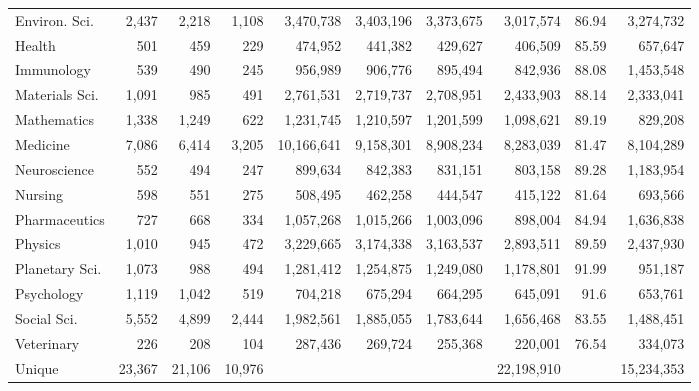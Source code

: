 \begin{tabular}{lrrrrrrrrr}
Environ. Sci.     &    2,437 &              2,218 &   1,108 &  3,470,738 &     3,403,196 & 3,373,675 &  3,017,574 &        86.94 &  3,274,732 \\
Health            &      501 &                459 &     229 &    474,952 &       441,382 &   429,627 &    406,509 &        85.59 &    657,647 \\
Immunology        &      539 &                490 &     245 &    956,989 &       906,776 &   895,494 &    842,936 &        88.08 &  1,453,548 \\
Materials Sci.    &    1,091 &                985 &     491 &  2,761,531 &     2,719,737 & 2,708,951 &  2,433,903 &        88.14 &  2,333,041 \\
Mathematics       &    1,338 &              1,249 &     622 &  1,231,745 &     1,210,597 & 1,201,599 &  1,098,621 &        89.19 &    829,208 \\
Medicine          &    7,086 &              6,414 &   3,205 & 10,166,641 &     9,158,301 & 8,908,234 &  8,283,039 &        81.47 &  8,104,289 \\
Neuroscience      &      552 &                494 &     247 &    899,634 &       842,383 &   831,151 &    803,158 &        89.28 &  1,183,954 \\
Nursing           &      598 &                551 &     275 &    508,495 &       462,258 &   444,547 &    415,122 &        81.64 &    693,566 \\
Pharmaceutics     &      727 &                668 &     334 &  1,057,268 &     1,015,266 & 1,003,096 &    898,004 &        84.94 &  1,636,838 \\
Physics           &    1,010 &                945 &     472 &  3,229,665 &     3,174,338 & 3,163,537 &  2,893,511 &        89.59 &  2,437,930 \\
Planetary Sci.    &    1,073 &                988 &     494 &  1,281,412 &     1,254,875 & 1,249,080 &  1,178,801 &        91.99 &    951,187 \\
Psychology        &    1,119 &              1,042 &     519 &    704,218 &       675,294 &   664,295 &    645,091 &         91.6 &    653,761 \\
Social Sci.       &    5,552 &              4,899 &   2,444 &  1,982,561 &     1,885,055 & 1,783,644 &  1,656,468 &        83.55 &  1,488,451 \\
Veterinary        &      226 &                208 &     104 &    287,436 &       269,724 &   255,368 &    220,001 &        76.54 &    334,073 \\
Unique            &   23,367 &             21,106 &  10,976 &            &               &           & 22,198,910 &              & 15,234,353 \\
\bottomrule
\end{tabular}
